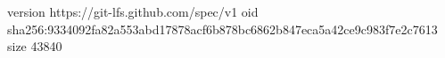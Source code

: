 version https://git-lfs.github.com/spec/v1
oid sha256:9334092fa82a553abd17878acf6b878bc6862b847eca5a42ce9c983f7e2c7613
size 43840
